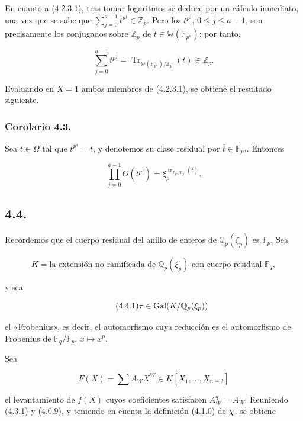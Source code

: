 En cuanto a (4.2.3.1), tras tomar logaritmos se deduce por un cálculo
inmediato, una vez que se sabe que
$\sum_{j=0}^{a-1}t^{p^j}\in\mathbb Z_p$. Pero los $t^{p^j}$,
$0\leq j\leq a-1$, son precisamente los conjugados sobre $\mathbb Z_p$
de $t\in\mathbb W(\mathbb F_{p^a})$; por tanto,

\[
\sum_{j=0}^{a-1}t^{p^j}
=\operatorname{Tr}_{\mathbb W(\mathbb F_{p^a})/\mathbb Z_p}(t)\in\mathbb Z_p.
\]

Evaluando en $X=1$ ambos miembros de (4.2.3.1), se obtiene el resultado
siguiente.

\subsubsection*{Corolario 4.3.}
Sea $t\in\Omega$ tal que $t^{p^a}=t$, y denotemos su clase residual por
$\bar t\in\mathbb F_{p^a}$. Entonces

\begin{equation}\tag{4.3.1}
\prod_{j=0}^{a-1}\Theta(t^{p^j})
=\xi_p^{\operatorname{tr}_{\mathbb F_{p^a}/\mathbb F_p}(\bar t)}.
\end{equation}

\pageoriginale

\subsection*{4.4.}
Recordemos que el cuerpo residual del anillo de enteros de
$\mathbb Q_p(\xi_p)$ es $\mathbb F_p$. Sea

\begin{equation}\tag{4.4.0}
K=\text{la extensión no ramificada de $\mathbb Q_p(\xi_p)$ con cuerpo
residual $\mathbb F_q$},
\end{equation}

y sea

\begin{equation}\tag{4.4.1}
\tau\in\operatorname{Gal}(K/\sisi{Q}{\mathbb Q}_p(\xi_p))
\end{equation}

el «Frobenius», es decir, el automorfismo cuya reducción es el automorfismo
de Frobenius de $\mathbb F_q/\mathbb F_p$, $x\longmapsto x^p$.

Sea

\begin{equation}\tag{4.4.2}
F(X)=\sum A_WX^W\in K[X_1,\ldots,X_{n+2}]
\end{equation}

el levantamiento de $f(X)$ cuyos coeficientes satisfacen $A_W^q=A_W$.
Reuniendo (4.3.1) y (4.0.9), y teniendo en cuenta la definición (4.1.0) de
$\sisi{X}{\chi}$, se obtiene

